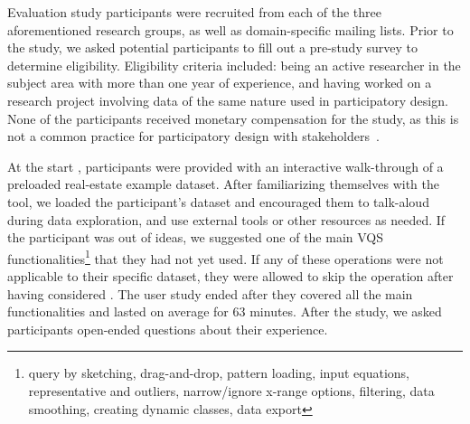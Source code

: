   \par Evaluation study participants were recruited from each of the three aforementioned research groups, as well as domain-specific mailing lists. Prior to the study, we asked potential participants to fill out a pre-study survey to determine eligibility. Eligibility criteria included: being an active researcher in the subject area with more than one year of experience, and having worked on a research project involving data of the same nature used in participatory design. None of the participants received monetary compensation for the study, as this is not a common practice for participatory design with stakeholders~\cite{Ommen2016,McNally2017}. 
  \par At the start , participants were provided with an interactive walk-through of a preloaded real-estate example dataset. After familiarizing themselves with the tool, we loaded the participant's dataset and encouraged them to talk-aloud during data exploration, and use external tools or other resources as needed. If the participant was out of ideas, we suggested one of the main VQS functionalities\footnote{query by sketching, drag-and-drop, pattern loading, input equations, representative and outliers, narrow/ignore x-range options, filtering, data smoothing, creating dynamic classes,  data export} that they had not yet used. If any of these operations were not applicable to their specific dataset, they were allowed to skip the operation after having considered . The user study ended after they covered all the main functionalities and lasted on average for 63 minutes. After the study, we asked participants open-ended questions about their experience.